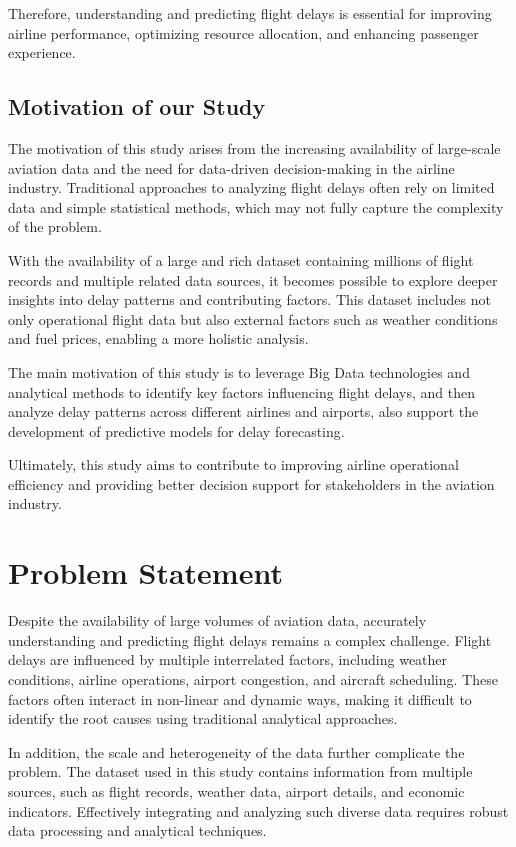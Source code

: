 \documentclass[12pt,a4paper]{report}
\begin{document}
Therefore, understanding and predicting flight delays is essential for improving airline performance, optimizing resource allocation, and enhancing passenger experience.

\subsection{Motivation of our Study}

The motivation of this study arises from the increasing availability of large-scale aviation data and the need for data-driven decision-making in the airline industry. Traditional approaches to analyzing flight delays often rely on limited data and simple statistical methods, which may not fully capture the complexity of the problem.

With the availability of a large and rich dataset containing millions of flight records and multiple related data sources, it becomes possible to explore deeper insights into delay patterns and contributing factors. This dataset includes not only operational flight data but also external factors such as weather conditions and fuel prices, enabling a more holistic analysis.

The main motivation of this study is to leverage Big Data technologies and analytical methods to identify key factors influencing flight delays, and then analyze delay patterns across different airlines and airports, also support the development of predictive models for delay forecasting.

Ultimately, this study aims to contribute to improving airline operational efficiency and providing better decision support for stakeholders in the aviation industry.

\section{Problem Statement}

Despite the availability of large volumes of aviation data, accurately understanding and predicting flight delays remains a complex challenge. Flight delays are influenced by multiple interrelated factors, including weather conditions, airline operations, airport congestion, and aircraft scheduling. These factors often interact in non-linear and dynamic ways, making it difficult to identify the root causes using traditional analytical approaches.

In addition, the scale and heterogeneity of the data further complicate the problem. The dataset used in this study contains information from multiple sources, such as flight records, weather data, airport details, and economic indicators. Effectively integrating and analyzing such diverse data requires robust data processing and analytical techniques.
\end{document}
